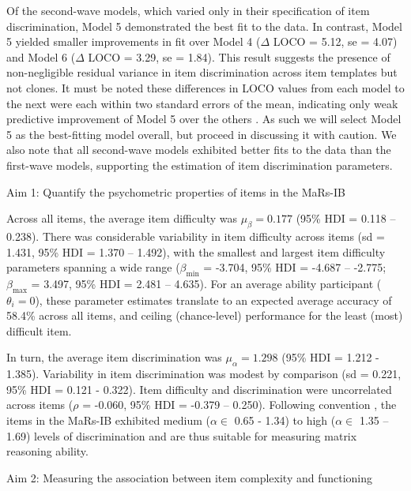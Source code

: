 \documentclass[a4paper,man,natbib]{apa6}
\makeatletter
\renewcommand{\subsubsection}{\@startsection{subsubsection}{3}
  {\z@}%
  {\b@level@two@skip}{\e@level@two@skip}%
  {\normalfont\normalsize\bfseries}}
\makeatother
\begin{document}
Of the second-wave models, which varied only in their specification of item discrimination, Model 5 demonstrated the best fit to the data. In contrast, Model 5 yielded smaller improvements in fit over Model 4 ($\Delta$ LOCO = 5.12, se = 4.07) and Model 6 ($\Delta$ LOCO = 3.29, se = 1.84). This result suggests the presence of non-negligible residual variance in item discrimination across item templates but not clones. It must be noted these differences in LOCO values from each model to the next were each within two standard errors of the mean, indicating only weak predictive improvement of Model 5 over the others \citep{vehtari2022cv}. As such we will select Model 5 as the best-fitting model overall, but proceed in discussing it with caution. We also note that all second-wave models exhibited better fits to the data than the first-wave models, supporting the estimation of item discrimination parameters.

\subsubsection{Aim 1: Quantify the psychometric properties of items in the MaRs-IB}

Across all items, the average item difficulty was $\mu_\beta = 0.177$ (95\% HDI = 0.118 -- 0.238). There was considerable variability in item difficulty across items (sd = 1.431, 95\% HDI = 1.370 -- 1.492), with the smallest  and largest item difficulty parameters spanning a wide range ($\beta_{\min}$ = -3.704, 95\% HDI = -4.687 -- -2.775; $\beta_{\max}$ = 3.497, 95\% HDI = 2.481 -- 4.635). For an average ability participant ($\theta_i = 0$), these parameter estimates translate to an expected average accuracy of 58.4\% across all items, and ceiling (chance-level) performance for the least (most) difficult item.

In turn, the average item discrimination was $\mu_\alpha = 1.298$ (95\% HDI = 1.212 - 1.385). Variability in item discrimination was modest by comparison (sd = 0.221, 95\% HDI = 0.121 - 0.322). Item difficulty and discrimination were uncorrelated across items ($\rho$ = -0.060, 95\% HDI = -0.379 -- 0.250). Following convention \citep{baker2017basics}, the items in the MaRs-IB exhibited medium ($\alpha \in$ 0.65 - 1.34) to high ($\alpha \in$ 1.35 – 1.69) levels of discrimination and are thus suitable for measuring matrix reasoning ability.

\subsubsection{Aim 2: Measuring the association between item complexity and functioning}
\end{document}
